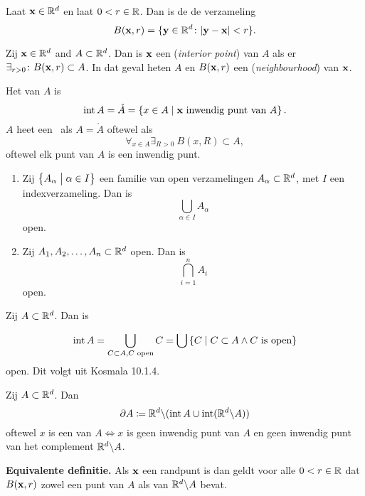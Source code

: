 \documentclass{2wa40summary}
\begin{document}
	\begin{define}[Bol]
		Laat ${\textbf{x}}\in\mathbb{R}^d$ en laat $0<r\in\mathbb{R}$. Dan is de  de verzameling
		\[
		B({\textbf{x}},r)=\lbrace{\textbf{y}} \in \mathbb{R}^d \colon {\left|{\textbf{y}}-{\textbf{x}}\right|}<r\rbrace.
		\]
		
	\end{define}
	\begin{define} Zij ${\textbf{x}} \in \mathbb{R}^d$ and $A \subset \mathbb{R}^d$. Dan is ${\textbf{x}}$ een
		 (\textit{interior point}) van $A$
		als er $\exists_{r>0}\colon B({\textbf{x}},r) \subset A$.
		In dat geval heten $A$ en $B({\textbf{x}},r)$ een  (\textit{neighbourhood}) van ${\textbf{x}}$.
	\end{define}
	\begin{define}
		Het  van $A$ is
		\[\operatorname{\mathop{int}} A=\mathring{A}=\left\lbrace x \in A \mid {\textbf{x}} \text{ inwendig punt van } A\right\rbrace . \]
		$A$ heet een \ als $A=\mathring{A}$ oftewel als
		\[
		\forall _{x \in A} \exists _{R >0}\: B(x,R) \subset A,
		\]
		oftewel elk punt van $A$ is een inwendig punt.
	\end{define}
	\begin{theorem}
		\begin{enumerate}[(1)]
			\item Zij $\left\lbrace A_\alpha \bigm| \alpha \in I \right\rbrace$ een familie van open verzamelingen $A_\alpha \subset \mathbb{R}^d$, met $I$ een indexverzameling. Dan is
			\[
			\bigcup_{\alpha \in I}A_\alpha
			\]
			open.
			\item Zij $A_1,A_2,\dots,A_n \subset \mathbb{R}^d$ open. Dan is
			\[
			\bigcap_{i=1}^{n}A_i
			\]
			open.
		\end{enumerate}
	\end{theorem}
	\begin{theorem}
		Zij $A\subset\mathbb{R}^d$. Dan is
		\item \[\operatorname{\mathop{int}} A=\bigcup_{C \subset A, C \text{ open} }C=\bigcup \left\lbrace C \mid C \subset A \wedge C \text{ is open}\right\rbrace\]
		open. Dit volgt uit Kosmala 10.1.4.
	\end{theorem}
	\begin{define}
		Zij $A \subset \mathbb{R}^d$. Dan
		\[\partial A\coloneqq  \mathbb{R}^d\backslash (\operatorname{\mathop{int}} A \cup \operatorname{\mathop{int}} (\mathbb{R}^d\backslash A))\]
		oftewel $x$ is een  van $A \iff x$ is geen inwendig punt van $A$ en geen inwendig punt van het complement $\mathbb{R}^d\backslash A$.
		
		\textbf{Equivalente definitie.} Als ${\textbf{x}}$ een randpunt is dan geldt voor alle $0<r\in\mathbb{R}$ dat
		$B({\textbf{x}},r)$ zowel een punt van $A$ als van $\mathbb{R}^d \backslash A$ bevat.
	\end{define}
\end{document}
